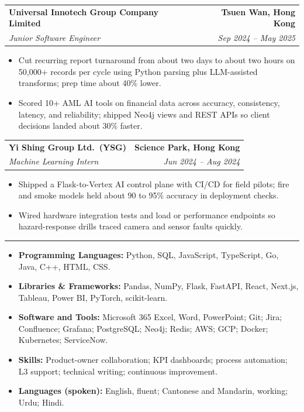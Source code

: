 \documentclass[10pt,a4paper]{article}
\makeatletter
\newcommand{\ressection}[1]{%
  \par\vspace{0.65em}%
  \noindent{\large\scshape\bfseries #1}\par\nobreak
  \noindent\rule{\linewidth}{0.4pt}\par\vspace{0.4em}}
\newcommand{\resumeSubheading}[4]{
  \vspace{0.2em}
  \begin{tabular*}{\textwidth}{l@{\extracolsep{\fill}}r}
    \textbf{#1} & \textbf{#2} \\
    \textit{\small #3} & \textit{\small #4} \\
  \end{tabular*}\vspace{-0.3em}
}
\makeatother
\begin{document}
\resumeSubheading{Universal Innotech Group Company Limited}{Tsuen Wan, Hong Kong}{Junior Software Engineer}{Sep 2024 -- May 2025}
\begin{itemize}
  \item Cut recurring report turnaround from about two days to about two hours on 50{,}000+ records per cycle using Python parsing plus LLM-assisted transforms; prep time about 40\% lower.
  \item Scored 10+ AML AI tools on financial data across accuracy, consistency, latency, and reliability; shipped Neo4j views and REST APIs so client decisions landed about 30\% faster.
\end{itemize}

\resumeSubheading{Yi Shing Group Ltd.\ (YSG)}{Science Park, Hong Kong}{Machine Learning Intern}{Jun 2024 -- Aug 2024}
\begin{itemize}
  \item Shipped a Flask-to-Vertex AI control plane with CI/CD for field pilots; fire and smoke models held about 90 to 95\% accuracy in deployment checks.
  \item Wired hardware integration tests and load or performance endpoints so hazard-response drills traced camera and sensor faults quickly.
\end{itemize}

\ressection{Skills and Interests}
\begin{itemize}
  \item \textbf{Programming Languages:} Python, SQL, JavaScript, TypeScript, Go, Java, C++, HTML, CSS.
  \item \textbf{Libraries \& Frameworks:} Pandas, NumPy, Flask, FastAPI, React, Next.js, Tableau, Power BI, PyTorch, scikit-learn.
  \item \textbf{Software and Tools:} Microsoft 365 Excel, Word, PowerPoint; Git; Jira; Confluence; Grafana; PostgreSQL; Neo4j; Redis; AWS; GCP; Docker; Kubernetes; ServiceNow.
  \item \textbf{Skills:} Product-owner collaboration; KPI dashboards; process automation; L3 support; technical writing; continuous improvement.
  \item \textbf{Languages (spoken):} English, fluent; Cantonese and Mandarin, working; Urdu; Hindi.
\end{itemize}
\end{document}
